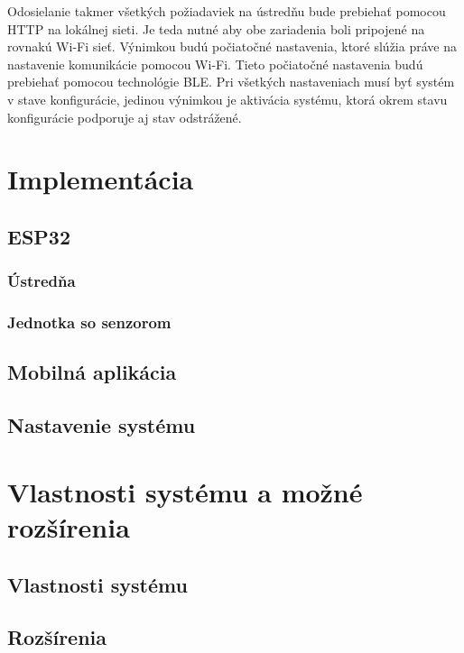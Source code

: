 Odosielanie takmer všetkých požiadaviek na ústredňu bude prebiehať pomocou HTTP na lokálnej sieti. Je teda nutné aby obe zariadenia boli pripojené na rovnakú Wi-Fi sieť. Výnimkou budú počiatočné nastavenia, ktoré slúžia práve na nastavenie komunikácie pomocou Wi-Fi. Tieto počiatočné nastavenia budú prebiehať pomocou technológie BLE. Pri všetkých nastaveniach musí byť systém v stave konfigurácie, jedinou výnimkou je aktivácia systému, ktorá okrem stavu konfigurácie podporuje aj stav odstrážené.

\chapter{Implementácia}

\section{ESP32}

\subsection{Ústredňa}

\subsection{Jednotka so senzorom}

\section{Mobilná aplikácia}

\section{Nastavenie systému}



\chapter{Vlastnosti systému a možné rozšírenia}

\section{Vlastnosti systému}

\section{Rozšírenia}

